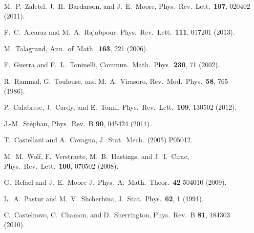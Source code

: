 \documentclass[twocolumn,superscriptaddress,prb,10pt]{revtex4-1}
\begin{document}
\begin{thebibliography}{99}
M.~P.~Zaletel, J.~H.~Bardarson, and J.~E.~Moore, Phys.\ Rev.\ Lett.\ {\bf 107}, 
020402 (2011).

F.~C.~Alcaraz and M.~A.~Rajabpour, Phys.\ Rev.\ Lett.\ {\bf 111}, 017201 (2013).

M.~Talagrand, Ann.\ of\ Math.\ {\bf 163}, 221 (2006). 

F.~Guerra and F.~L.~Toninelli, Commun.\ Math.\ Phys.\ {\bf 230}, 71 (2002). 

R.~Rammal, G.~Toulouse, and M.~A.~Virasoro, Rev.\ Mod.\ Phys.\ {\bf 58}, 765 
(1986).

P.~Calabrese, J.~Cardy, and E.~Tonni, Phys.\ Rev.\ Lett.\ {\bf 109}, 
130502 (2012). 

J.-M.~St\'ephan, Phys.\ Rev.\ B {\bf 90}, 045424 (2014). 

T.~Castellani and A.~Cavagna, J.\ Stat.\ Mech.\ (2005) P05012. 

M.~M.~Wolf, F.~Verstraete, M.~B.~Hastings, and J.~I.~Cirac, Phys.\ Rev.\ Lett.\ 
{\bf 100}, 070502 (2008). 

G.~Refael and J.~E.~Moore J.\ Phys.\ A:\ Math.\ Theor.\ {\bf 42} 504010 (2009).

L.~A.~Pastur and M.~V.~Shcherbina, J.\ Stat.\ Phys.\ {\bf 62}, 1 (1991).

C.~Castelnovo, C.~Chamon, and D.~Sherrington, Phys.\ Rev.\ B {\bf 81}, 184303 (2010).

\end{thebibliography}
\end{document}
